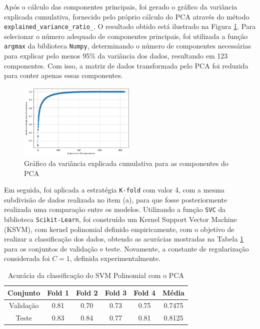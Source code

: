 \documentclass[]{abntex2}
\begin{document}
Após o cálculo das componentes principais, foi gerado o gráfico da variância explicada cumulativa, fornecido pelo próprio cálculo do PCA através do método \texttt{explained\_variance\_ratio\_}. O resultado obtido está ilustrado na Figura \ref{fig:vari_pca}. Para selecionar o número adequado de componentes principais, foi utilizada a função \texttt{argmax} da biblioteca \texttt{Numpy}, determinando o número de componentes necessárias para explicar pelo menos 95\% da variância dos dados, resultando em 123 componentes. Com isso, a matriz de dados transformada pelo PCA foi reduzida para conter apenas essas componentes.

\begin{figure}[H]
    \centering 
    \includegraphics[width=0.5\textwidth]{imgs/ex1/vari_pca.png}
    \caption{Gráfico da variância explicada cumulativa para as componentes do PCA}
    \label{fig:vari_pca} %
\end{figure}

Em seguida, foi aplicada a estratégia \texttt{K-fold} com valor 4, com a mesma subdivisão de dados realizada no item (a), para que fosse posteriormente realizada uma comparação entre os modelos. Utilizando a função \texttt{SVC} da biblioteca \texttt{Scikit-Learn}, foi construído um Kernel Support Vector Machine (KSVM), com kernel polinomial definido empiricamente, com o objetivo de realizar a classificação dos dados, obtendo as acurácias mostradas na Tabela \ref{tab:pca_svm} para os conjuntos de validação e teste. Novamente, a constante de regularização considerada foi \(C=1\), definida experimentalmente.

\begin{table}[H]
    \centering
    \begin{tabular}{|c|c|c|c|c|c|}
    \hline
    \rowcolor[HTML]{C0C0C0} 
    Conjunto                          & Fold 1 & Fold 2 & Fold 3 & Fold 4 & Média  \\ \hline
    \cellcolor[HTML]{C0C0C0}Validação & 0.81   & 0.70   & 0.73   & 0.75   & 0.7475  \\ \hline
    \cellcolor[HTML]{C0C0C0}Teste     & 0.83   & 0.84   & 0.77   & 0.81   & 0.8125 \\ \hline
    \end{tabular}
    \caption{Acurácia da classificação do SVM Polinomial com o PCA}
    \label{tab:pca_svm}
\end{table}
\end{document}
